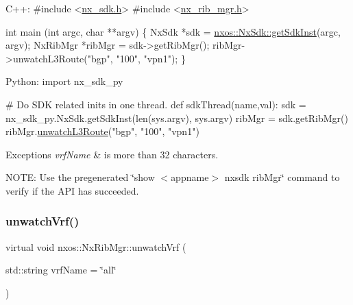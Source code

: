 \begin{DoxyCode}
C++:
\textcolor{preprocessor}{   #include <\mbox{\hyperlink{nx__sdk_8h}{nx\_sdk.h}}>}
\textcolor{preprocessor}{   #include <\mbox{\hyperlink{nx__rib__mgr_8h}{nx\_rib\_mgr.h}}>}

   \textcolor{keywordtype}{int}  main (\textcolor{keywordtype}{int} argc, \textcolor{keywordtype}{char} **argv)
   \{
        NxSdk    *sdk = \mbox{\hyperlink{classnxos_1_1_nx_sdk_a5050e2d26c40744b4fc7862068a83f39}{nxos::NxSdk::getSdkInst}}(argc, argv);
        NxRibMgr *ribMgr = sdk->getRibMgr();
        ribMgr->unwatchL3Route(\textcolor{stringliteral}{"bgp"}, \textcolor{stringliteral}{"100"}, \textcolor{stringliteral}{"vpn1"});
   \}

Python:
   \textcolor{keyword}{import} nx\_sdk\_py

\textcolor{preprocessor}{   # Do SDK related inits in one thread.}
   def sdkThread(name,val):
       sdk = nx\_sdk\_py.NxSdk.getSdkInst(len(sys.argv), sys.argv)
       ribMgr = sdk.getRibMgr()
       ribMgr.\mbox{\hyperlink{classnxos_1_1_nx_rib_mgr_a1dc61ed1d830f50ea947707576d75b99}{unwatchL3Route}}(\textcolor{stringliteral}{"bgp"}, \textcolor{stringliteral}{"100"}, \textcolor{stringliteral}{"vpn1"})
\end{DoxyCode}



\begin{DoxyExceptions}{Exceptions}
{\em vrf\+Name} & is more than 32 characters.\\
\hline
\end{DoxyExceptions}
N\+O\+TE\+: Use the pregenerated \char`\"{}show $<$appname$>$ nxsdk rib\+Mgr\char`\"{} command to verify if the A\+PI has succeeded. \mbox{\label{classnxos_1_1_nx_rib_mgr_a957da78022cd4af95ee27941d0b67ce0}} 
\subsubsection{\texorpdfstring{unwatch\+Vrf()}{unwatchVrf()}}
{\footnotesize\ttfamily virtual void nxos\+::\+Nx\+Rib\+Mgr\+::unwatch\+Vrf (\begin{DoxyParamCaption}\item[{std\+::string}]{vrf\+Name = {\ttfamily \char`\"{}all\char`\"{}} }\end{DoxyParamCaption})\hspace{0.3cm}{\ttfamily [pure virtual]}}

